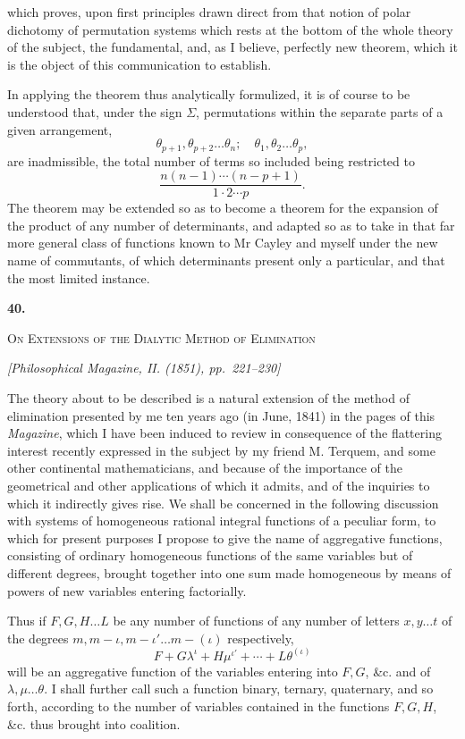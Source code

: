 \documentclass[11pt]{article}
\newcommand{\paperhead}[3]{%
  \clearpage
  \begin{center}
  {\Large\bfseries #1.}\par\vspace{0.85em}
  {\large\scshape #2}\par\vspace{0.6em}
  {\itshape [#3]}\par
  \end{center}\vspace{0.4em}}
\newcommand{\sourcepage}[1]{\marginpar{\scriptsize p.~#1}}
\begin{document}
{{\sourcepage{255}
which proves, upon first principles drawn direct from that notion of polar dichotomy of permutation systems which rests at the bottom of the whole theory of the subject, the fundamental, and, as I believe, perfectly new theorem, which it is the object of this communication to establish.

In applying the theorem thus analytically formulized, it is of course to be understood that, under the sign $\Sigma$, permutations within the separate parts of a given arrangement,
\[
\theta_{p+1},\theta_{p+2}\ldots\theta_n;\quad\theta_1,\theta_2\ldots\theta_p,
\]
are inadmissible, the total number of terms so included being restricted to
\[
\frac{n(n-1)\cdots(n-p+1)}{1\cdot2\cdots p}.
\]
The theorem may be extended so as to become a theorem for the expansion of the product of any number of determinants, and adapted so as to take in that far more general class of functions known to Mr Cayley and myself under the new name of commutants, of which determinants present only a particular, and that the most limited instance.

\paperhead{40}{On Extensions of the Dialytic Method of Elimination}{Philosophical Magazine, II. (1851), pp.~221--230}

\sourcepage{256}
The theory about to be described is a natural extension of the method of elimination presented by me ten years ago (in June, 1841) in the pages of this \emph{Magazine}, which I have been induced to review in consequence of the flattering interest recently expressed in the subject by my friend M. Terquem, and some other continental mathematicians, and because of the importance of the geometrical and other applications of which it admits, and of the inquiries to which it indirectly gives rise. We shall be concerned in the following discussion with systems of homogeneous rational integral functions of a peculiar form, to which for present purposes I propose to give the name of aggregative functions, consisting of ordinary homogeneous functions of the same variables but of different degrees, brought together into one sum made homogeneous by means of powers of new variables entering factorially.

Thus if $F,G,H\ldots L$ be any number of functions of any number of letters $x,y\ldots t$ of the degrees $m,m-\iota,m-\iota'\ldots m-(\iota)$ respectively,
\[
F+G\lambda^\iota+H\mu^{\iota'}+\cdots+L\theta^{(\iota)}
\]
will be an aggregative function of the variables entering into $F,G$, \&c. and of $\lambda,\mu\ldots\theta$. I shall further call such a function binary, ternary, quaternary, and so forth, according to the number of variables contained in the functions $F,G,H$, \&c. thus brought into coalition.

}}
\end{document}
